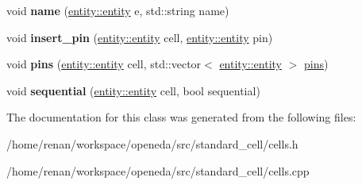 \begin{DoxyCompactItemize}
\item 
\hypertarget{classophidian_1_1standard__cell_1_1cells_a0007b2ba1710f1614fd3c491b433e06d}{void {\bfseries name} (\hyperlink{classophidian_1_1entity_1_1entity}{entity\-::entity} e, std\-::string name)}\label{classophidian_1_1standard__cell_1_1cells_a0007b2ba1710f1614fd3c491b433e06d}

\item 
\hypertarget{classophidian_1_1standard__cell_1_1cells_a241460f336bad48e6616c216f6d66d85}{void {\bfseries insert\-\_\-pin} (\hyperlink{classophidian_1_1entity_1_1entity}{entity\-::entity} cell, \hyperlink{classophidian_1_1entity_1_1entity}{entity\-::entity} pin)}\label{classophidian_1_1standard__cell_1_1cells_a241460f336bad48e6616c216f6d66d85}

\item 
\hypertarget{classophidian_1_1standard__cell_1_1cells_a1188981026f1b070386d0e3b615b59f3}{void {\bfseries pins} (\hyperlink{classophidian_1_1entity_1_1entity}{entity\-::entity} cell, std\-::vector$<$ \hyperlink{classophidian_1_1entity_1_1entity}{entity\-::entity} $>$ \hyperlink{classophidian_1_1standard__cell_1_1pins}{pins})}\label{classophidian_1_1standard__cell_1_1cells_a1188981026f1b070386d0e3b615b59f3}

\item 
\hypertarget{classophidian_1_1standard__cell_1_1cells_ad524c127da5ae570e89cb37fb13a52b9}{void {\bfseries sequential} (\hyperlink{classophidian_1_1entity_1_1entity}{entity\-::entity} cell, bool sequential)}\label{classophidian_1_1standard__cell_1_1cells_ad524c127da5ae570e89cb37fb13a52b9}

\end{DoxyCompactItemize}


The documentation for this class was generated from the following files\-:\begin{DoxyCompactItemize}
\item 
/home/renan/workspace/openeda/src/standard\-\_\-cell/cells.\-h\item 
/home/renan/workspace/openeda/src/standard\-\_\-cell/cells.\-cpp\end{DoxyCompactItemize}
